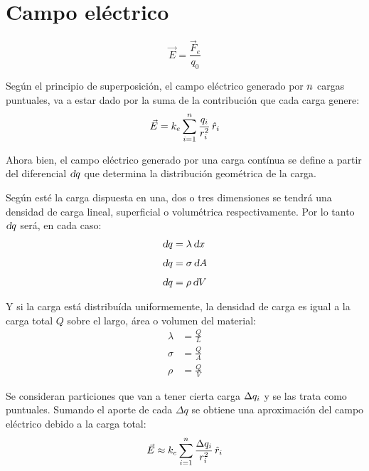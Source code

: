 \section{Campo eléctrico}

\begin{mdframed}[style=DefinitionFrame]
    \begin{defn}
    \end{defn}
    \begin{equation*}
        \Vec{E} = \frac{\Vec{F}_e}{q_0}
    \end{equation*}
\end{mdframed}

Según el principio de superposición, el campo eléctrico generado por $n$ cargas puntuales, va a estar dado por la suma de la contribución que cada carga genere:
\begin{equation}
    \Vec{E}= k_e \sum_{i=1}^n \frac{q_i}{r_i^2} \, \hat{r}_i
\end{equation}

Ahora bien, el campo eléctrico generado por una carga contínua se define a partir del diferencial $\textsl{d} q$ que determina la distribución geométrica de la carga.

Según esté la carga dispuesta en una, dos o tres dimensiones se tendrá una densidad de carga lineal, superficial o volumétrica respectivamente.
Por lo tanto $\textsl{d} q$ será, en cada caso:
\begin{align*}
    \textsl{d} q &= \lambda \, \textsl{d} x
    \\[1ex]
    \textsl{d} q &= \sigma \, \textsl{d} A
    \\[1ex]
    \textsl{d} q &= \rho \, \textsl{d} V
\end{align*}

Y si la carga está distribuída uniformemente, la densidad de carga es igual a la carga total $Q$ sobre el largo, área o volumen del material:
\begin{align*}
    \lambda &= \frac{Q}{L}
    \\[1ex]
    \sigma &= \frac{Q}{A}
    \\[1ex]
    \rho &= \frac{Q}{V}
\end{align*}

Se consideran particiones que van a tener cierta carga $\Delta q_i$ y se las trata como puntuales.
Sumando el aporte de cada $\Delta q$ se obtiene una aproximación del campo eléctrico debido a la carga total:
\begin{equation*}
    \Vec{E} \approx k_e \sum_{i=1}^n \frac{\Delta q_i}{r_i^2} \, \hat{r}_i
\end{equation*}

